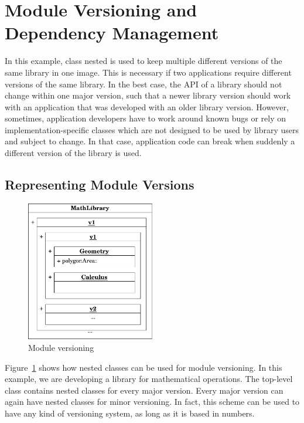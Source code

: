 \section{Module Versioning and Dependency Management}
In this example, class nested is used to keep multiple different versions of the same library in one image. This is necessary if two applications require different versions of the same library. In the best case, the API of a library should not change within one major version, such that a newer library version should work with an application that was developed with an older library version. However, sometimes, application developers have to work around known bugs or rely on implementation-specific classes which are not designed to be used by library users and subject to change. In that case, application code can break when suddenly a different version of the library is used.

\subsection{Representing Module Versions}
\begin{figure}
	\includegraphics[width=0.5\textwidth]{usecase_define_version.pdf}
	\centering
	\caption{Module versioning}
	\label{fig:use_module_ver}
\end{figure}

Figure~\ref{fig:use_module_ver} shows how nested classes can be used for module versioning. In this example, we are developing a library for mathematical operations. The top-level class contains nested classes for every major version. Every major version can again have nested classes for minor versioning. In fact, this scheme can be used to have any kind of versioning system, as long as it is based in numbers.

